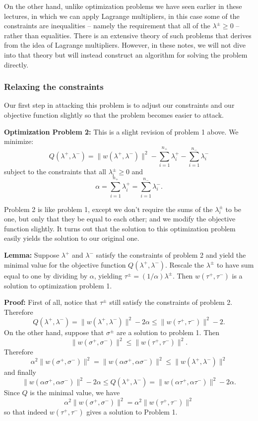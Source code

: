 \documentclass[
]{article}
\begin{document}
On the other hand, unlike optimization problems we have seen earlier in
these lectures, in which we can apply Lagrange multipliers, in this case
some of the constraints are inequalities -- namely the requirement that
all of the \(\lambda^{\pm}\ge 0\) -- rather than equalities. There is an
extensive theory of such problems that derives from the idea of Lagrange
multipliers. However, in these notes, we will not dive into that theory
but will instead construct an algorithm for solving the problem
directly.

\hypertarget{relaxing-the-constraints}{%
\subsubsection{Relaxing the
constraints}\label{relaxing-the-constraints}}

Our first step in attacking this problem is to adjust our constraints
and our objective function slightly so that the problem becomes easier
to attack.

\textbf{Optimization Problem 2:} This is a slight revision of problem 1
above. We minimize: \[
Q(\lambda^{+},\lambda^{-}) = \|w(\lambda^{+},\lambda^{-})\|^2-\sum_{i=1}^{n_{+}}\lambda^{+}_{i}-\sum_{i=1}^{n_{-}}\lambda^{-}_{i}
\] subject to the constraints that all \(\lambda^{\pm}_{i}\ge 0\) and \[
\alpha = \sum_{i=1}^{n_{+}}\lambda^+_{i} = \sum_{i=1}^{n_{-}}\lambda^{-}_{i}.
\]

Problem 2 is like problem 1, except we don't require the sums of the
\(\lambda^{\pm}_{i}\) to be one, but only that they be equal to each
other; and we modify the objective function slightly. It turns out that
the solution to this optimization problem easily yields the solution to
our original one.

\textbf{Lemma:} Suppose \(\lambda^{+}\) and \(\lambda^{-}\) satisfy the
constraints of problem 2 and yield the minimal value for the objective
function \(Q(\lambda^{+},\lambda^{-})\). Rescale the \(\lambda^{\pm}\)
to have sum equal to one by dividing by \(\alpha\), yielding
\(\tau^{\pm}=(1/\alpha)\lambda^{\pm}\). Then \(w(\tau^{+},\tau^{-})\) is
a solution to optimization problem 1.

\textbf{Proof:} First of all, notice that \(\tau^{\pm}\) still satisfy
the constraints of problem 2. Therefore \[
Q(\lambda^{+},\lambda^{-}) = \|w(\lambda^{+},\lambda^{-})\|^2-2\alpha\le \|w(\tau^{+},\tau^{-})\|^2-2.
\] On the other hand, suppose that \(\sigma^{\pm}\) are a solution to
problem 1. Then \[
\|w(\sigma^{+},\sigma^{-})\|^2\le \|w(\tau^{+},\tau^{-})\|^2.
\] Therefore \[
\alpha^2 \|w(\sigma^{+},\sigma^{-})\|^2 = \|w(\alpha\sigma^{+},\alpha\sigma^{-})\|^2\le \|w(\lambda^{+},\lambda^{-})\|^2
\] and finally \[
\|w(\alpha\sigma^{+},\alpha\sigma^{-})\|^2-2\alpha\le Q(\lambda^{+},\lambda^{-})=\|w(\alpha\tau^{+},\alpha\tau^{-})\|^2-2\alpha.
\] Since \(Q\) is the minimal value, we have \[
\alpha^{2}\|w(\sigma^{+},\sigma^{-})\|^2 = \alpha^{2}\|w(\tau^{+},\tau^{-})\|^2
\] so that indeed \(w(\tau^{+},\tau^{-})\) gives a solution to Problem
1.
\end{document}
